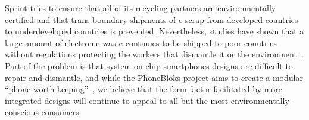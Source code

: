 Sprint tries to ensure that all of its recycling partners are environmentally
certified and that trans-boundary shipments of e-scrap from developed
countries to underdeveloped countries is prevented. Nevertheless, studies
have shown that a large amount of electronic waste continues to be shipped to
poor countries without regulations protecting the workers that dismantle it
or the environment~\cite{etbc-dumping}. Part of the problem is that
system-on-chip smartphones designs are difficult to repair and dismantle, and
while the PhoneBloks project aims to create a modular ``phone worth
keeping''~\cite{phonebloks-url}, we believe that the form factor facilitated
by more integrated designs will continue to appeal to all but the most
environmentally-conscious consumers.
